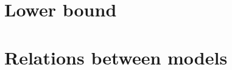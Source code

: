 

\section{Lower bound}\label{section-prob-lower-bound}



\section{Relations between models}\label{relations}

